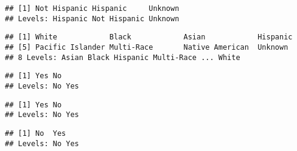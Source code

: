 \documentclass[]{article}
\newenvironment{Shaded}{\begin{snugshade}}{\end{snugshade}}
\newcommand{\KeywordTok}[1]{\textcolor[rgb]{0.13,0.29,0.53}{\textbf{#1}}}
\newcommand{\OperatorTok}[1]{\textcolor[rgb]{0.81,0.36,0.00}{\textbf{#1}}}
\newcommand{\NormalTok}[1]{#1}
\begin{document}
\begin{verbatim}
## [1] Not Hispanic Hispanic     Unknown     
## Levels: Hispanic Not Hispanic Unknown
\end{verbatim}

\begin{Shaded}
\end{Shaded}

\begin{verbatim}
## [1] White            Black            Asian            Hispanic        
## [5] Pacific Islander Multi-Race       Native American  Unknown         
## 8 Levels: Asian Black Hispanic Multi-Race ... White
\end{verbatim}

\begin{Shaded}
\end{Shaded}

\begin{verbatim}
## [1] Yes No 
## Levels: No Yes
\end{verbatim}

\begin{Shaded}
\end{Shaded}

\begin{verbatim}
## [1] Yes No 
## Levels: No Yes
\end{verbatim}

\begin{Shaded}
\end{Shaded}

\begin{verbatim}
## [1] No  Yes
## Levels: No Yes
\end{verbatim}

\begin{Shaded}
\end{Shaded}
\end{document}
